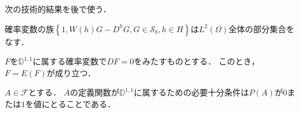 次の技術的結果を後で使う．
\begin{lemma}\label{lem1.2.4}%
確率変数の族$\left\{1,W(h)G-D^hG,G\in\mathcal{S}_b,h\in H\right\}$は$L^2(\Omega)$全体の部分集合をなす．
\end{lemma}

\begin{proposition}\label{prop1.2.5}%
$F$を$\mathbb{D}^{1,1}$に属する確率変数で$DF=0$をみたすものとする．
このとき，$F=E(F)$が成り立つ．
\end{proposition}

\begin{proposition}\label{prop1.2.6}%
$A\in\mathcal{F}$とする．
$A$の定義関数が$\mathbb{D}^{1,1}$に属するための必要十分条件は$P(A)$が$0$または$1$を値にとることである．
\end{proposition}

